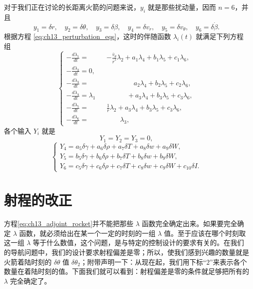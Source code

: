 对于我们正在讨论的长距离火箭的问题来说，$y_i$ 就是那些扰动量，因而 $n=6$，并且
\begin{equation}\label{eq:ch13_y_def}
y_1 = \delta r, \quad y_2 = \delta \theta, \quad y_3 = \delta \beta, \quad y_4 = \delta v_r, \quad y_5 = \delta v_\theta, \quad y_6 = \delta \dot{\beta}.
\end{equation}
根据方程 \eqref{eq:ch13_perturbation_eqs}，这时的伴随函数 $\lambda_i(t)$ 就满足下列方程组
\begin{equation}\label{eq:ch13_adjoint_rocket}
\left\{
\begin{array}{lllll}
-\frac{d\lambda_1}{dt} = & &-\frac{\bar{v}_\theta}{\bar{r}^2} \lambda_2 + a_1 \lambda_4 + b_1 \lambda_5 + c_1 \lambda_6,\\
-\frac{d\lambda_2}{dt} =0, \\
-\frac{d\lambda_3}{dt} = & &\quad\quad\quad\quad a_2 \lambda_4 + b_2 \lambda_5 + c_2 \lambda_6, \\
-\frac{d\lambda_4}{dt} = \lambda_1& & \quad\quad\quad +a_3 \lambda_4 + b_3 \lambda_5 + c_3 \lambda_6, \\
-\frac{d\lambda_5}{dt} =&& \frac{1}{\bar{r}} \lambda_2 + a_3 \lambda_4 + b_3 \lambda_5 + c_3 \lambda_6, \\
-\frac{d\lambda_6}{dt} =&& \quad\quad\lambda_3,
\end{array}
\right.
\end{equation}
各个输入 $Y_i$ 就是
\begin{equation}\label{eq:ch13_Y_zero}
Y_1 = Y_2 = Y_3 = 0,
\end{equation}
\begin{equation}\label{eq:ch13_Y456}
\begin{cases}
Y_4 = a_5 \delta \gamma + a_6 \delta \rho + a_7 \delta T + a_8 \delta w + a_9 \delta W,\\
Y_5 = b_5 \delta \gamma + b_6 \delta \rho + b_7 \delta T + b_8 \delta w + b_9 \delta W,\\
Y_6 = c_5 \delta \gamma + c_6 \delta \rho + c_7 \delta T + c_8 \delta w + c_9 \delta W + c_{10} \delta I.
\end{cases}
\end{equation}


\section{射程的改正}

方程\eqref{eq:ch13_adjoint_rocket}并不能把那些 $\lambda$ 函数完全确定出来。如果要完全确定 $\lambda$ 函数，就必须给出在某一个一定的时刻的一组 $\lambda$ 值。至于应该在哪个时刻取这一组 $\lambda$ 等于什么数值，这个问题，是与特定的控制设计的要求有关的。在我们的导航问题中，我们的设计要求射程偏差是零；所以，使我们感到兴趣的数量就是火箭着陆时刻的 $\delta \theta$ 值 $\delta \theta_2$；附带声明一下：从现在起，我们用下标“$2$”来表示各个数量在着陆时刻的值。下面我们就可以看到：射程偏差是零的条件就足够把所有的 $\lambda$ 完全确定了。

